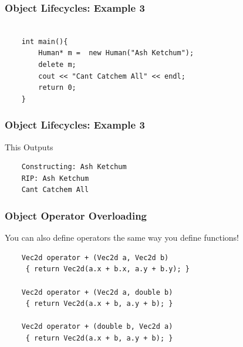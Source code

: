 \documentclass{beamer}
\begin{document}
\begin{frame}[fragile]
    \frametitle{Object Lifecycles: Example 3}
    \begin{verbatim}

    int main(){
        Human* m =  new Human("Ash Ketchum");
        delete m;
        cout << "Cant Catchem All" << endl;
        return 0;
    }
    \end{verbatim}
\end{frame}
\begin{frame}[fragile]
    \frametitle{Object Lifecycles: Example 3}
    This Outputs
    \begin{verbatim}
    Constructing: Ash Ketchum
    RIP: Ash Ketchum
    Cant Catchem All
    \end{verbatim}

\end{frame}

\begin{frame}[fragile]
    \frametitle{Object Operator Overloading }
    You can also define operators the same way you define functions!
    \begin{verbatim}
    Vec2d operator + (Vec2d a, Vec2d b) 
     { return Vec2d(a.x + b.x, a.y + b.y); }

    Vec2d operator + (Vec2d a, double b)
     { return Vec2d(a.x + b, a.y + b); }

    Vec2d operator + (double b, Vec2d a)
     { return Vec2d(a.x + b, a.y + b); }
    \end{verbatim}

\end{frame}
\end{document}
